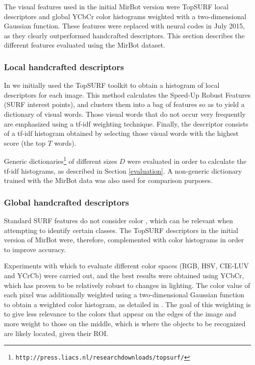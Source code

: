 \documentclass[final, twocolumn]{elsarticle}
\begin{document}
The visual features used in the initial MirBot version \cite{MirBot:System} were TopSURF local descriptors \citep{Thomee2010TOP-SURF:Toolkit} and global YCbCr color histograms weighted with a two-dimensional Gaussian function. These features were replaced with neural codes in July 2015, as they clearly outperformed handcrafted descriptors. This section describes the different features evaluated using the MirBot dataset. 


\subsubsection{Local handcrafted descriptors}

In \cite{MirBot:System} we initially used the TopSURF \citep{Thomee2010TOP-SURF:Toolkit} toolkit to obtain a histogram of local descriptors for each image. This method calculates the Speed-Up Robust Features (SURF \citep{Bay2008Speeded-UpSURF} interest points), and clusters them \citep{Philbin2007ObjectMatching} into a bag of features so as to yield a dictionary of visual words. Those visual words that do not occur very frequently are emphasized using a tf-idf \citep{Salton1983IntroductionRetrieval.} weighting technique. Finally, the descriptor consists of a tf-idf histogram obtained by selecting those visual words with the highest score (the top $T$ words). 

Generic dictionaries\footnote{\texttt{http://press.liacs.nl/researchdownloads/topsurf/}} of different sizes $D$ were evaluated in order to calculate the tf-idf histograms, as described in Section \ref{evaluation}. A non-generic dictionary trained with the MirBot data was also used for comparison purposes. 


\subsubsection{Global handcrafted descriptors}

Standard SURF features do not consider color \cite{Jeong2001Histogram-BasedRetrieval}, which can be relevant when attempting to identify certain classes. The TopSURF descriptors in the initial version of MirBot \cite{MirBot:System} were, therefore, complemented with color histograms in order to improve accuracy. 

Experiments with which to evaluate different color spaces (RGB, HSV, CIE-LUV and YCrCb) were carried out, and the best results were obtained using YCbCr, which has proven to be relatively robust to changes in lighting. The color value of each pixel was additionally weighted using a two-dimensional Gaussian function to obtain a weighted color histogram, as detailed in \cite{MirBot:System}. The goal of this weighting is to give less relevance to the colors that appear on the edges of the image and more weight to those on the middle, which is where the objects to be recognized are likely located, given their ROI.
\end{document}
